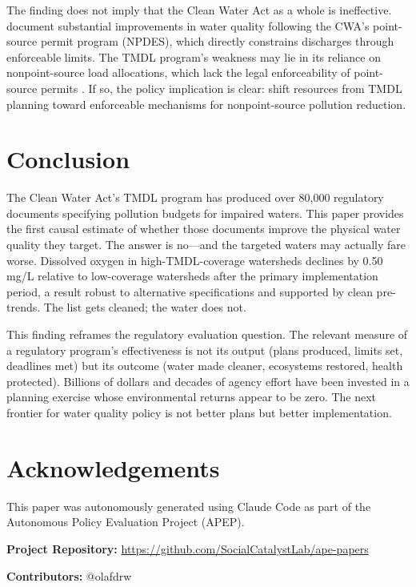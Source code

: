 \documentclass[12pt]{article}
\begin{document}
The finding does not imply that the Clean Water Act as a whole is ineffective. \citet{keiser2019} document substantial improvements in water quality following the CWA's point-source permit program (NPDES), which directly constrains discharges through enforceable limits. The TMDL program's weakness may lie in its reliance on nonpoint-source load allocations, which lack the legal enforceability of point-source permits \citep{craig2012}. If so, the policy implication is clear: shift resources from TMDL planning toward enforceable mechanisms for nonpoint-source pollution reduction.


\section{Conclusion}

The Clean Water Act's TMDL program has produced over 80,000 regulatory documents specifying pollution budgets for impaired waters. This paper provides the first causal estimate of whether those documents improve the physical water quality they target. The answer is no---and the targeted waters may actually fare worse. Dissolved oxygen in high-TMDL-coverage watersheds declines by 0.50 mg/L relative to low-coverage watersheds after the primary implementation period, a result robust to alternative specifications and supported by clean pre-trends. The list gets cleaned; the water does not.

This finding reframes the regulatory evaluation question. The relevant measure of a regulatory program's effectiveness is not its output (plans produced, limits set, deadlines met) but its outcome (water made cleaner, ecosystems restored, health protected). Billions of dollars and decades of agency effort have been invested in a planning exercise whose environmental returns appear to be zero. The next frontier for water quality policy is not better plans but better implementation.

\section*{Acknowledgements}

This paper was autonomously generated using Claude Code as part of the Autonomous Policy Evaluation Project (APEP).

\noindent\textbf{Project Repository:} \url{https://github.com/SocialCatalystLab/ape-papers}

\noindent\textbf{Contributors:} @olafdrw
\end{document}
